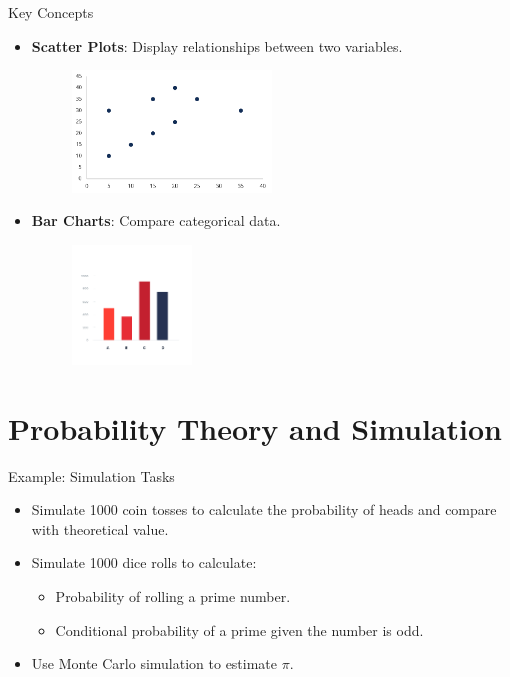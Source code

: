 \documentclass{beamer}
\begin{document}
\begin{frame}{Key Concepts}
\begin{itemize}
    \item \textbf{Scatter Plots}: Display relationships between two variables.
    \begin{figure}
        \centering
        \includegraphics[width=0.5\textwidth]{scatter-plot.png}
    \end{figure}
    \item \textbf{Bar Charts}: Compare categorical data.
    \begin{figure}
        \centering
        \includegraphics[width=0.3\textwidth]{bar-chart.png}
    \end{figure}
\end{itemize}
\end{frame}


\section{Probability Theory and Simulation}


\begin{frame}{Example: Simulation Tasks}
    \begin{itemize}
        \item Simulate 1000 coin tosses to calculate the probability of heads and compare with theoretical value.
        \item Simulate 1000 dice rolls to calculate:
        \begin{itemize}
            \item Probability of rolling a prime number.
            \item Conditional probability of a prime given the number is odd.
        \end{itemize}
        \item Use Monte Carlo simulation to estimate $\pi$.
    \end{itemize}
    \end{frame}
\end{document}
